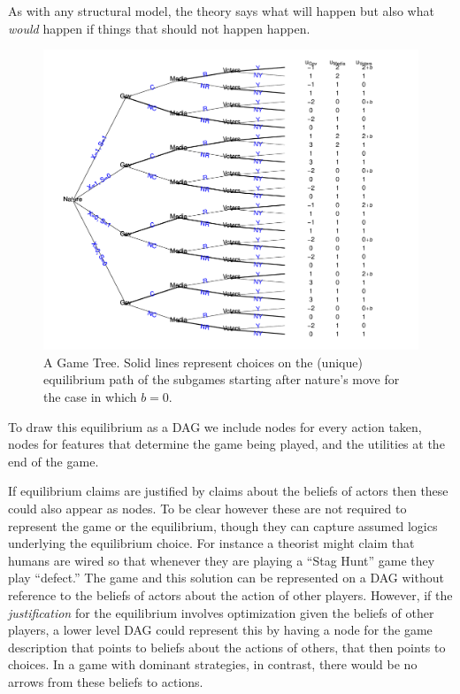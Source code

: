 \documentclass[12pt,]{book}
\begin{document}
As with any structural model, the theory says what will happen but also what \emph{would} happen if things that should not happen happen.

\begin{figure}
\centering
\includegraphics{ii_files/figure-latex/game1-1.pdf}
\caption{\label{fig:game1}\label{fig:tree} A Game Tree. Solid lines represent choices on the (unique) equilibrium path of the subgames starting after nature's move for the case in which \(b=0\).}
\end{figure}

To draw this equilibrium as a DAG we include nodes for every action taken, nodes for features that determine the game being played, and the utilities at the end of the game.

If equilibrium claims are justified by claims about the beliefs of actors then these could also appear as nodes. To be clear however these are not required to represent the game or the equilibrium, though they can capture assumed logics underlying the equilibrium choice. For instance a theorist might claim that humans are wired so that whenever they are playing a ``Stag Hunt'' game they play ``defect.'' The game and this solution can be represented on a DAG without reference to the beliefs of actors about the action of other players. However, if the \emph{justification} for the equilibrium involves optimization given the beliefs of other players, a lower level DAG could represent this by having a node for the game description that points to beliefs about the actions of others, that then points to choices. In a game with dominant strategies, in contrast, there would be no arrows from these beliefs to actions.
\end{document}
